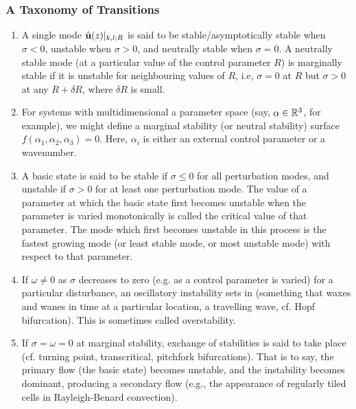 \subsubsection{A Taxonomy of Transitions}

\begin{enumerate}
    \item A single mode $\hat{{\textbf{u}}}(z)|_{k,l;R}$ is said to be stable/asymptotically stable when $\sigma < 0$, unstable when $\sigma > 0$, and neutrally stable when $\sigma = 0$. A neutrally stable mode (at a particular value of the control parameter $R$) is marginally stable if it is unstable for neighbouring values of $R$, i.e, $\sigma = 0$ at $R$ but $\sigma > 0$ at any $R + \delta R$, where $\delta R$ is small. 
    
    \item For systems with multidimensional a parameter space (say, $\alpha \in \mathbb{R}^3$, for example), we might define a marginal stability (or neutral stability) surface $f(\alpha_1, \alpha_2, \alpha_3) = 0$. Here, $\alpha_i$ is either an external control parameter or a wavenumber. 
    
    \item A basic state is said to be stable if $\sigma \leq 0$ for all perturbation modes, and unstable if $\sigma > 0$ for at least one perturbation mode. The value of a parameter at which the basic state first becomes unstable when the parameter is varied monotonically is called the critical value of that parameter. The mode which first becomes unstable in this process is the fastest growing mode (or least stable mode, or most unstable mode) with respect to that parameter. 
    
    \item If $\omega \neq 0$ as $\sigma$ decreases to zero (e.g. as a control parameter is varied) for a particular disturbance, an oscillatory instability sets in (something that waxes and wanes in time at a particular location, a travelling wave, cf. Hopf bifurcation). This is sometimes called overstability.
    
    \item If $\sigma = \omega = 0$ at marginal stability, exchange of stabilities is said to take place (cf. turning point, transcritical, pitchfork bifurcations). That is to say, the primary flow (the basic state) becomes unstable, and the instability becomes dominant, producing a secondary flow (e.g., the appearance of regularly tiled cells in Rayleigh-Benard convection). 
    

\end{enumerate}
